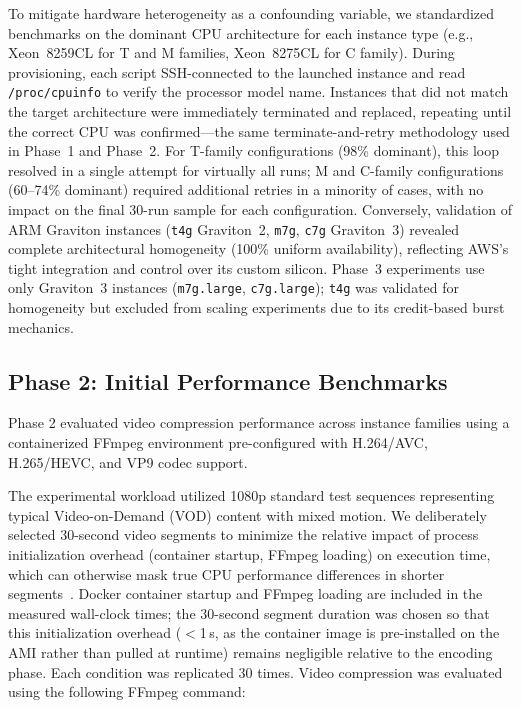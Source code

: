 \documentclass[conference]{IEEEtran}
\begin{document}
To mitigate hardware heterogeneity as a confounding variable, we standardized
benchmarks on the dominant CPU architecture for each instance type
(e.g., Xeon~8259CL for T and M families, Xeon~8275CL for C family).
During provisioning, each script SSH-connected to the launched instance and
read \texttt{/proc/cpuinfo} to verify the processor model name. Instances
that did not match the target architecture were immediately terminated and
replaced, repeating until the correct CPU was confirmed---the same
terminate-and-retry methodology used in Phase~1 and Phase~2. For T-family
configurations (98\% dominant), this loop resolved in a single attempt for
virtually all runs; M and C-family configurations (60--74\% dominant)
required additional retries in a minority of cases, with no impact on the
final 30-run sample for each configuration. Conversely, validation of ARM Graviton instances (\texttt{t4g} Graviton~2, \texttt{m7g}, \texttt{c7g} Graviton~3) revealed complete architectural homogeneity (100\% uniform availability), reflecting AWS's tight integration and control over its custom silicon. Phase~3 experiments use only Graviton~3 instances (\texttt{m7g.large}, \texttt{c7g.large}); \texttt{t4g} was validated for homogeneity but excluded from scaling experiments due to its credit-based burst mechanics.

\subsection{Phase 2: Initial Performance Benchmarks}

Phase 2 evaluated video compression performance across instance families using
a containerized FFmpeg environment pre-configured with H.264/AVC, H.265/HEVC,
and VP9 codec support.

The experimental workload utilized 1080p standard test sequences representing
typical Video-on-Demand (VOD) content with mixed motion. We deliberately
selected 30-second video segments to minimize the relative impact of process
initialization overhead (container startup, FFmpeg loading) on execution time,
which can otherwise mask true CPU performance differences in shorter segments~\cite{dockercoldstart}.
Docker container startup and FFmpeg loading are included in the measured wall-clock times; the 30-second segment duration was chosen so that this initialization overhead ($<$1\,s, as the container image is pre-installed on the AMI rather than pulled at runtime) remains negligible relative to the encoding phase.
Each condition was replicated 30 times. Video compression was evaluated using
the following FFmpeg command:
\end{document}
